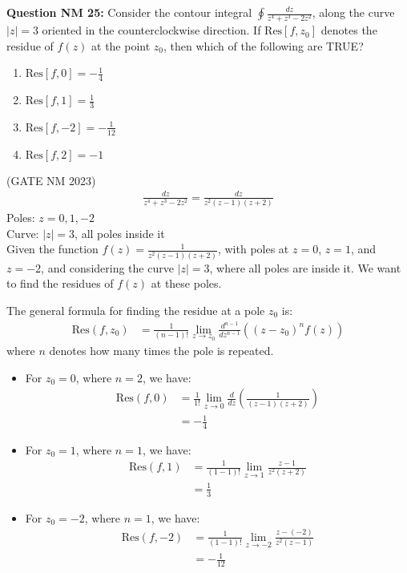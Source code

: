 \documentclass[journal,12pt,twocolumn]{IEEEtran}
\theoremstyle{remark}
\begin{document}
\title{}
\author{Sasa Mardi, EE23BTECH11222}
\date{}
\maketitle

\textbf{Question NM 25:} Consider the contour integral $\oint \frac{dz}{z^4 + z^3 - 2z^2}$, along the curve $|z| = 3$ oriented in the counterclockwise direction. If $\text{Res}[f, z_0]$ denotes the residue of $f(z)$ at the point $z_0$, then which of the following are TRUE? \\
\begin{enumerate}
    \item $\text{Res}[f, 0] = -\frac{1}{4}$
    \item $\text{Res}[f, 1] = \frac{1}{3}$
    \item $\text{Res}[f, -2] = -\frac{1}{12}$
    \item $\text{Res}[f, 2] = -1$
\end{enumerate}
\hfill{(GATE NM 2023)}\\
\solution
\begin{align}
\frac{dz}{z^4 + z^3 - 2z^2} = \frac{dz}{z^2(z-1)(z+2)}
\end{align}
Poles: $z = 0, 1, -2$ \\
Curve: $|z| = 3$, all poles inside it \\
Given the function $f(z) = \frac{1}{z^2(z-1)(z+2)}$, with poles at $z = 0$, $z = 1$, and $z = -2$, and considering the curve $|z| = 3$, where all poles are inside it. We want to find the residues of $f(z)$ at these poles.

The general formula for finding the residue at a pole $z_0$ is:
\begin{align}
\text{Res}(f, z_0) &= \frac{1}{(n-1)!} \lim_{z \to z_0} \frac{d^{n-1}}{dz^{n-1}} \left( (z - z_0)^n f(z) \right)
\end{align}
where $n$ denotes how many times the pole is repeated.

\begin{itemize}
    \item For $z_0 = 0$, where $n = 2$, we have:
    \begin{align}
    \text{Res}(f, 0) &= \frac{1}{1!} \lim_{z \to 0} \frac{d}{dz} \left( \frac{1}{(z-1)(z+2)} \right) \\
    &= -\frac{1}{4}
    \end{align}
    
    \item For $z_0 = 1$, where $n = 1$, we have:
    \begin{align}
    \text{Res}(f, 1) &= \frac{1}{(1-1)!} \lim_{z \to 1} \frac{z-1}{z^2(z+2)} \\
    &= \frac{1}{3}
    \end{align}
    
    \item For $z_0 = -2$, where $n = 1$, we have:
    \begin{align}
    \text{Res}(f, -2) &= \frac{1}{(1-1)!} \lim_{z \to -2} \frac{z-(-2)}{z^2(z-1)} \\
    &= -\frac{1}{12}
    \end{align}
\end{itemize}
\end{document}
